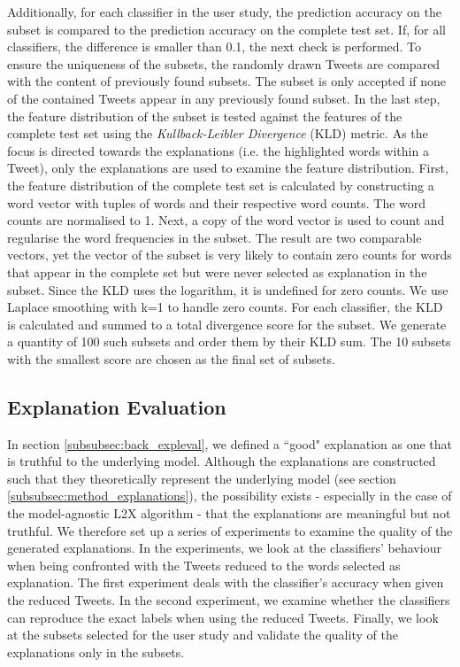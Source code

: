 Additionally, for each classifier in the user study, the prediction accuracy on the subset is compared to the prediction accuracy on the complete test set. If, for all classifiers, the difference is smaller than 0.1, the next check is performed.\newline
To ensure the uniqueness of the subsets, the randomly drawn Tweets are compared with the content of previously found subsets. The subset is only accepted if none of the contained Tweets appear in any previously found subset.\newline
In the last step, the feature distribution of the subset is tested against the features of the complete test set using the \textit{Kullback-Leibler Divergence} (KLD) metric. As the focus is directed towards the explanations (i.e. the highlighted words within a Tweet), only the explanations are used to examine the feature distribution. First, the feature distribution of the complete test set is calculated by constructing a word vector with tuples of words and their respective word counts. The word counts are normalised to 1. Next, a copy of the word vector is used to count and regularise the word frequencies in the subset. The result are two comparable vectors, yet the vector of the subset is very likely to contain zero counts for words that appear in the complete set but were never selected as explanation in the subset. Since the KLD uses the logarithm, it is undefined for zero counts. We use Laplace smoothing with k=1 to handle zero counts. For each classifier, the KLD is calculated and summed to a total divergence score for the subset.\newline
We generate a quantity of 100 such subsets and order them by their KLD sum. The 10 subsets with the smallest score are chosen as the final set of subsets.\newline




\subsection{Explanation Evaluation}
\label{subsec:expleval}
In section \ref{subsubsec:back_expleval}, we defined a ``good" explanation as one that is truthful to the underlying model. Although the explanations are constructed such that they theoretically represent the underlying model (see section \ref{subsubsec:method_explanations}), the possibility exists - especially in the case of the model-agnostic L2X algorithm - that the explanations are meaningful but not truthful.\newline
We therefore set up a series of experiments to examine the quality of the generated explanations. In the experiments, we look at the classifiers' behaviour when being confronted with the Tweets reduced to the words selected as explanation. The first experiment deals with the classifier's accuracy when given the reduced Tweets. In the second experiment, we examine whether the classifiers can reproduce the exact labels when using the reduced Tweets. Finally, we look at the subsets selected for the user study and validate the quality of the explanations only in the subsets.


